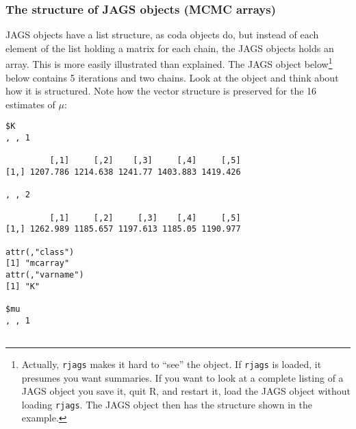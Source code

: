 \documentclass[12pt,english]{article}
\begin{document}
{\subsubsection{The structure of JAGS objects (MCMC arrays)}

JAGS objects have a list structure, as coda objects do, but instead of each element of the list holding a matrix for each chain, the JAGS objects holds an array. This is more easily illustrated than explained. The JAGS object below\footnote{Actually, \texttt{rjags} makes it hard to ``see'' the object. If \texttt{rjags} is loaded, it presumes you want summaries. If you want to look at a complete listing of a JAGS object you save it, quit R, and restart it, load the JAGS object without loading \texttt{rjags}. The JAGS object then has the structure shown in the example.} below contains 5 iterations and two chains. Look at the object and think about how it is structured. Note how the vector structure is preserved for the 16 estimates of $\mu$:

\begin{multicols}{2}
\begin{Verbatim}[fontsize=\tiny]
$K
, , 1

         [,1]     [,2]    [,3]     [,4]     [,5]
[1,] 1207.786 1214.638 1241.77 1403.883 1419.426

, , 2

         [,1]     [,2]     [,3]    [,4]     [,5]
[1,] 1262.989 1185.657 1197.613 1185.05 1190.977

attr(,"class")
[1] "mcarray"
attr(,"varname")
[1] "K"

$mu
, , 1


\end{Verbatim}
\end{multicols}}
\end{document}
